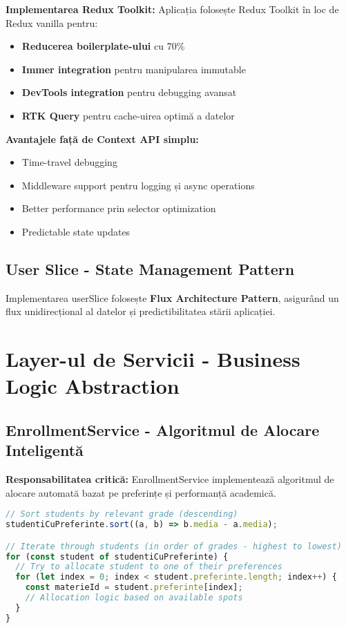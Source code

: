 \documentclass[11pt,a4paper]{article}
\begin{document}
\textbf{Implementarea Redux Toolkit:} Aplicația folosește Redux Toolkit în loc de Redux vanilla pentru:
\begin{itemize}
    \item \textbf{Reducerea boilerplate-ului} cu 70\%
    \item \textbf{Immer integration} pentru manipularea immutable
    \item \textbf{DevTools integration} pentru debugging avansat
    \item \textbf{RTK Query} pentru cache-uirea optimă a datelor
\end{itemize}

\textbf{Avantajele față de Context API simplu:}
\begin{itemize}
    \item Time-travel debugging
    \item Middleware support pentru logging și async operations
    \item Better performance prin selector optimization
    \item Predictable state updates
\end{itemize}

\subsection{User Slice - State Management Pattern}

Implementarea userSlice folosește \textbf{Flux Architecture Pattern}, asigurând un flux unidirecțional al datelor și predictibilitatea stării aplicației.

\section{Layer-ul de Servicii - Business Logic Abstraction}

\subsection{EnrollmentService - Algoritmul de Alocare Inteligentă}

\textbf{Responsabilitatea critică:} EnrollmentService implementează algoritmul de alocare automată bazat pe preferințe și performanță academică.

\begin{lstlisting}[language=JavaScript, caption=Algoritm de Alocare Prioritizată]
// Sort students by relevant grade (descending)
studentiCuPreferinte.sort((a, b) => b.media - a.media);

// Iterate through students (in order of grades - highest to lowest)
for (const student of studentiCuPreferinte) {
  // Try to allocate student to one of their preferences
  for (let index = 0; index < student.preferinte.length; index++) {
    const materieId = student.preferinte[index];
    // Allocation logic based on available spots
  }
}
\end{lstlisting}
\end{document}
